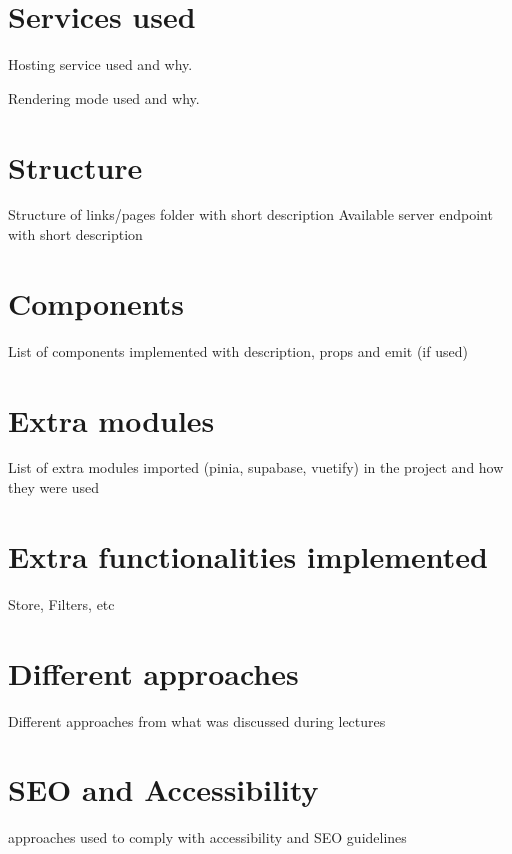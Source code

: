 \section{Services used}
Hosting service used and why.

Rendering mode used and why.

\section{Structure}
Structure of links/pages folder with short description
Available server endpoint with short description

\section{Components}
List of components implemented with description, props and emit (if used)

\section{Extra modules}
List of extra modules imported (pinia, supabase, vuetify) in the project and how they were used

\section{Extra functionalities implemented}
Store, Filters, etc

\section{Different approaches}
Different approaches from what was discussed during lectures

\section{SEO and Accessibility}
approaches used to comply with accessibility and SEO guidelines
